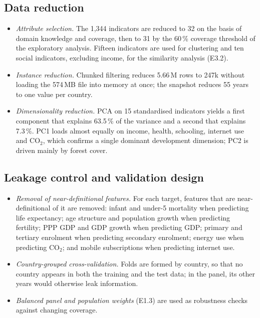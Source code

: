 \documentclass[11pt,a4paper]{article}
\begin{document}
\subsection{Data reduction}
\begin{itemize}
\item \emph{Attribute selection.} The 1,344 indicators are reduced to 32 on the basis of domain knowledge and coverage, then to 31 by the 60\,\% coverage threshold of the exploratory analysis. Fifteen indicators are used for clustering and ten social indicators, excluding income, for the similarity analysis (E3.2).
\item \emph{Instance reduction.} Chunked filtering reduces 5.66\,M rows to 247k without loading the 574\,MB file into memory at once; the snapshot reduces 55 years to one value per country.
\item \emph{Dimensionality reduction.} PCA on 15 standardised indicators yields a first component that explains 63.5\,\% of the variance and a second that explains 7.3\,\%. PC1 loads almost equally on income, health, schooling, internet use and CO$_2$, which confirms a single dominant development dimension; PC2 is driven mainly by forest cover.
\end{itemize}

\subsection{Leakage control and validation design}
\begin{itemize}
\item \emph{Removal of near-definitional features.} For each target, features that are near-definitional of it are removed: infant and under-5 mortality when predicting life expectancy; age structure and population growth when predicting fertility; PPP GDP and GDP growth when predicting GDP; primary and tertiary enrolment when predicting secondary enrolment; energy use when predicting CO$_2$; and mobile subscriptions when predicting internet use.
\item \emph{Country-grouped cross-validation.} Folds are formed by country, so that no country appears in both the training and the test data; in the panel, its other years would otherwise leak information.
\item \emph{Balanced panel and population weights} (E1.3) are used as robustness checks against changing coverage.
\end{itemize}

\end{document}
